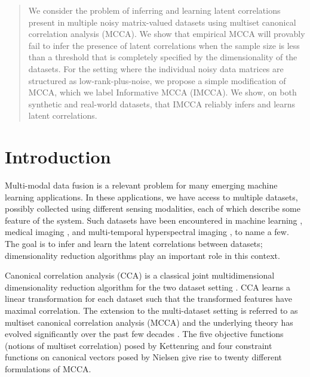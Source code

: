 \begin{abstract}
  We consider the problem of inferring and learning latent correlations present in
  multiple noisy matrix-valued datasets using multiset canonical correlation analysis
  (MCCA). We show that empirical MCCA will provably fail to infer the presence of latent
  correlations when the sample size is less than a threshold that is completely specified
  by the dimensionality of the datasets. For the setting where the individual noisy data
  matrices are structured as low-rank-plus-noise, we propose a simple modification of
  MCCA, which we label Informative MCCA (IMCCA).  We show, on both synthetic and real-world
  datasets, that IMCCA reliably infers and learns latent correlations.
\end{abstract}

\section{Introduction}\label{sec:intro}
Multi-modal data fusion is a relevant problem for many emerging machine learning
applications. In these applications, we have access to multiple datasets, possibly
collected using different sensing modalities, each of which describe some feature of the
system. Such datasets have been encountered in machine learning
\cite{hardoon2004canonical, dhillon2011multi,chaudhuri2009multi},
medical imaging \cite{correa2010canonical,
  deleus2011functional,zhang2014frequency,guccione2013functional,chen2014removal}, and
multi-temporal hyperspectral imaging \cite{nielsen2002multiset}, to name a few. The goal
is to infer and learn the latent correlations between datasets; dimensionality
reduction algorithms play an important role in this context.

Canonical correlation analysis (CCA) is a classical joint multidimensional dimensionality
reduction algorithm for the two dataset setting \cite{hotelling1936relations}. CCA learns
a linear transformation for each dataset such that the transformed features have maximal
correlation. The extension to the multi-dataset setting is referred to as multiset
canonical correlation analysis (MCCA) and the underlying theory has evolved significantly
over the past few decades \cite{vinograde1950canonical,steel1951minimum,
  horst1961generalized,kettenring1971canonical,nielsen1994analysis}. The five objective
functions (notions of multiset correlation) posed by Kettenring and four constraint
functions on canonical vectors posed by Nielsen give rise to twenty different formulations
of MCCA.

